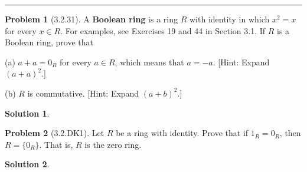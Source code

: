 \documentclass[12pt]{article}
\theoremstyle{definition}
\newtheorem*{prob}{Problem}
\newtheorem*{soln}{Solution}
\newcommand{\hr}{\vspace*{\parskip}\hrule}
\begin{document}
\hr

%
%


\begin{prob}[3.2.31]
A \textbf{Boolean ring} is a ring $R$ with identity in which 
$x^2 = x$ for every $x\in R$. For examples, see Exercises 19 and 44 in Section 3.1. 
If $R$ is a Boolean ring, prove that      

(a)   $a + a = 0_R$ for every $a\in R$, which means that $a = -a$. 
[Hint: Expand $(a + a)^2$.]     

(b) $R$ is commutative. [Hint: Expand $(a + b)^2$.]
\end{prob}

\begin{soln}

\end{soln}

\begin{prob}[3.2.DK1]
Let $R$ be a ring with identity. Prove that if $1_R=0_R$, then
$R = \{ 0_R \}$. That is, $R$ is the zero ring.
\end{prob}

\begin{soln}

\end{soln}
\end{document}
